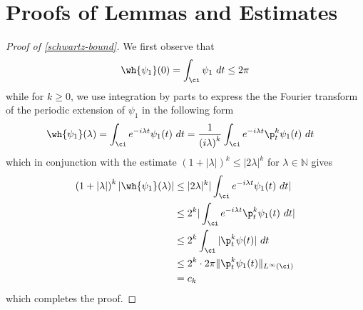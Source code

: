 \section{Proofs of Lemmas and Estimates}
\begin{proof}[Proof of \eqref{schwartz-bound}] We first observe that
\begin{equation*}
  \begin{split}
    \wh{\psi_1}(0) = \int_\ci \psi_1 \ dt \le 2 \pi 
  \end{split}
\end{equation*}
%
%
while for $k \ge 0$, we use integration by parts to express the 
the Fourier transform of the periodic extension of $\psi_1$ 
in the following form
%
%
\begin{equation*}
  \begin{split}
    \wh{\psi_1}(\lambda) 
    & = \int_\ci e^{-i \lambda t} \psi_1 (t) \ dt
    = \frac{1}{\left( i \lambda \right)^k } \int_\ci e^{-i \lambda t} 
    \p_t^k \psi_1(t) \ dt
  \end{split}
\end{equation*}
%
%
which in conjunction with the estimate $\left( 1 + |\lambda|  \right)^{k } \le |2 \lambda|^k$ for $\lambda \in \mathbb{N}$ 
gives
%
%
\begin{equation*}
  \begin{split}
    \left( 1 + |\lambda| \right)^k |\wh{\psi_1}(\lambda)|
    & \le |2 \lambda|^k | \int_\ci e^{-i \lambda t} \psi_1(t) \ dt |
    \\
    & \le 2 ^k | \int_\ci e^{-i \lambda t} \p_t^k \psi_1(t) \ dt|
    \\
    & \le 2^k \int_\ci | \p_t^k \psi(t) | \ dt 
    \\
    & \le 2^k \cdot 2 \pi  \|\p_t^k \psi_1(t) \|_{L^\infty(\ci)}
    \\
    & = c_k  
  \end{split}
\end{equation*}
%
which completes the proof.
\end{proof}
%
%
%
